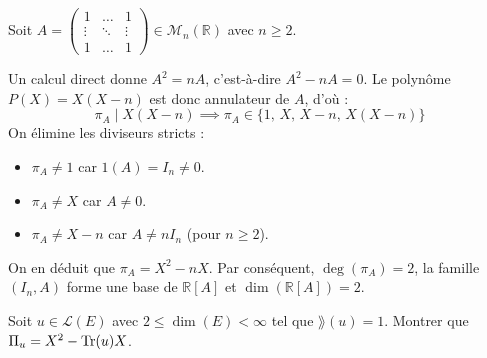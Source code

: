 \documentclass[11pt,a4paper]{report}
\begin{document}
\begin{example}
    Soit $A = \begin{pmatrix} 1 & \dots & 1 \\ \vdots & \ddots & \vdots \\ 1 & \dots & 1 \end{pmatrix} \in \mathcal{M}_n(\mathbb{R})$ avec $n \ge 2$.
    
    Un calcul direct donne $A^2 = nA$, c'est-à-dire $A^2 - nA = 0$. Le polynôme $P(X) = X(X - n)$ est donc annulateur de $A$, d'où :
    \[
        \pi_A \mid X(X - n) \implies \pi_A \in \{1, \, X, \, X - n, \, X(X - n)\}
    \]
    On élimine les diviseurs stricts :
    \begin{itemize}
        \item $\pi_A \neq 1$ car $1(A) = I_n \neq 0$.
        \item $\pi_A \neq X$ car $A \neq 0$.
        \item $\pi_A \neq X - n$ car $A \neq n I_n$ (pour $n \ge 2$).
    \end{itemize}
    On en déduit que $\pi_A = X^2 - nX$. Par conséquent, $\deg(\pi_A) = 2$, la famille $(I_n, A)$ forme une base de $\mathbb{R}[A]$ et $\dim(\mathbb{R}[A]) = 2$.
\end{example}

\begin{exercise}
    \label{exo:polynome-minimal-rang-1}
    Soit $u \in \mathcal L(E)$ avec $2 \le \dim(E) < \infty$ tel que $\rang(u) = 1$. Montrer que $\Pi_u = X^2 - \mathrm{Tr}(u)X$.
\end{exercise}
\end{document}
